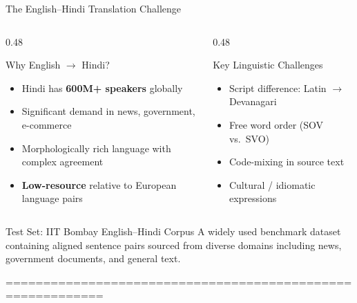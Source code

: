 \documentclass{beamer}
\begin{document}
\begin{frame}{The English–Hindi Translation Challenge}
  \begin{columns}[T]
    \begin{column}{0.48\textwidth}
      \begin{block}{Why English $\rightarrow$ Hindi?}
        \begin{itemize}
          \item Hindi has \textbf{600M+ speakers} globally
          \item Significant demand in news, government, e-commerce
          \item Morphologically rich language with complex agreement
          \item \textbf{Low-resource} relative to European language pairs
        \end{itemize}
      \end{block}
    \end{column}
    \begin{column}{0.48\textwidth}
      \begin{alertblock}{Key Linguistic Challenges}
        \begin{itemize}
          \item Script difference: Latin $\rightarrow$ Devanagari
          \item Free word order (SOV vs.\ SVO)
          \item Code-mixing in source text
          \item Cultural / idiomatic expressions
        \end{itemize}
      \end{alertblock}
    \end{column}
  \end{columns}
  \vspace{0.3cm}
  \begin{block}{Test Set: IIT Bombay English–Hindi Corpus}
    A widely used benchmark dataset containing aligned sentence pairs sourced from diverse domains including news, government documents, and general text.
  \end{block}
\end{frame}===========================================================
\end{document}
